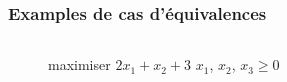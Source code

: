 \documentclass[aspectratio = 169]{beamer}
\begin{document}
\begin{frame}
  \frametitle{Examples de cas d'\'equivalences}
  \begin{columns}
    \begin{column}{.55\textwidth}
      \begin{figure}
        \begin{linearProg}{
            maximiser
          }{
            $2x_1 + x_2 + 3$
          }{
          }{
            $x_1$, $x_2$, $x_3 \geq 0$
          }
        \end{linearProg}
      \end{figure}
    \end{column}
    \vrule{}

    \quad
    \begin{column}{.55\textwidth}
      \begin{overlayarea}{\textwidth}{.55\textheight}


\end{overlayarea}
\end{column}
\end{columns}
\end{frame}
\end{document}
